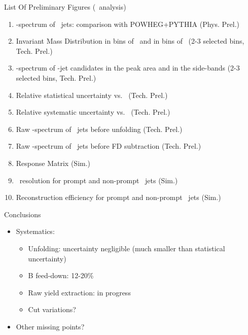 \documentclass[xcolor={usenames,dvipsnames}]{beamer}
\begin{document}
\begin{frame}{List Of Preliminary Figures (\pp\ analysis)}

{\footnotesize
    \begin{enumerate}
        \item \pt-spectrum of \Dzero\ jets: comparison with POWHEG+PYTHIA (Phys. Prel.)
        \item Invariant Mass Distribution in bins of \ptchjet\ and in bins of \ptd\ (2-3 selected bins, Tech. Prel.)
        \item \pt-spectrum of \Dzero-jet candidates in the peak area and in the side-bands (2-3 selected bins, Tech. Prel.)
        \item Relative statistical uncertainty vs. \ptchjet\ (Tech. Prel.)
        \item Relative systematic uncertainty vs. \ptchjet\ (Tech. Prel.)
        \item Raw \pt-spectrum of \Dzero\ jets before unfolding (Tech. Prel.)
        \item Raw \pt-spectrum of \Dzero\ jets before FD subtraction (Tech. Prel.)
        \item Response Matrix (Sim.)
        \item \ptchjet\ resolution for prompt and non-prompt \Dzero\ jets (Sim.)
        \item Reconstruction efficiency for prompt and non-prompt \Dzero\ jets (Sim.)
    \end{enumerate}
    }
\end{frame}

\begin{frame}{Conclusions}
    \begin{itemize}
        \item Systematics:
        \begin{itemize}
            \item Unfolding: uncertainty negligible (much smaller than statistical uncertainty)
            \item B feed-down: 12-20\%
            \item Raw yield extraction: in progress
            \item Cut variations?
        \end{itemize}
        \item Other missing points?
    \end{itemize}
\end{frame}
\end{document}
